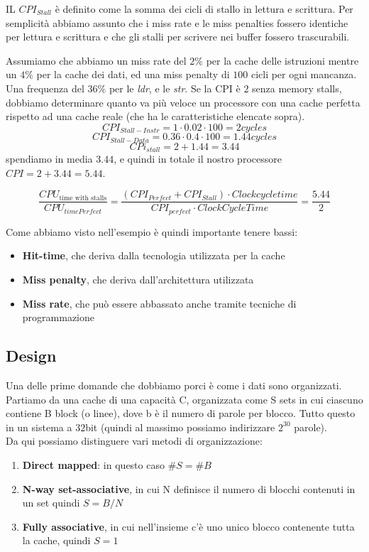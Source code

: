 \begin{observation}
	IL $CPI_{Stall}$ è definito come la somma dei cicli di stallo in lettura e scrittura. Per semplicità abbiamo assunto che i miss rate e le miss penalties fossero identiche per lettura e scrittura e che gli stalli per scrivere nei buffer fossero trascurabili.
\end{observation}

\begin{example}
	\label{example:cache_performance}
	Assumiamo che abbiamo un miss rate del \(2\%\) per la cache delle istruzioni mentre un \(4\%\) per la cache dei dati, ed una miss penalty di $100$ cicli per ogni mancanza. Una frequenza del \(36\%\) per le \emph{ldr}, e le \emph{str}. Se la CPI è $2$ senza memory stalls, dobbiamo determinare quanto va più veloce un processore con una cache perfetta rispetto ad una cache reale (che ha le caratteristiche elencate sopra).\\
	
	\[CPI_{Stall-Instr} = 1 \cdot 0.02 \cdot 100 = 2 cycles\]
	\[CPI_{Stall-Data} = 0.36 \cdot 0.4 \cdot 100 = 1.44 cycles\]
	\[CPi_{stall} = 2 + 1.44 = 3.44\]
	spendiamo in media $3.44$, e quindi in totale il nostro processore $CPI = 2 + 3.44 = 5.44$.
	
	\[\frac{CPU_{\text{time with stalls}}}{CPU_{time Perfect}} = \frac{(CPI_{Perfect} + CPI_{Stall}) \cdot Clockcycletime}{CPI_{perfect} \cdot ClockCycleTime} =  \frac{5.44}{2}\]
\end{example}

Come abbiamo visto nell'esempio è quindi importante tenere bassi:
\begin{itemize}
	\item \textbf{Hit-time}, che deriva dalla tecnologia utilizzata per la cache
	\item \textbf{Miss penalty}, che deriva dall'architettura utilizzata
	\item \textbf{Miss rate}, che può essere abbassato anche tramite tecniche di programmazione
\end{itemize}

\subsection{Design}
Una delle prime domande che dobbiamo porci è come i dati sono organizzati.\\
Partiamo da una cache di una capacità C, organizzata come S sets in cui ciascuno contiene B block (o linee), dove b è il numero di parole per blocco. Tutto questo in un sistema a $32$bit (quindi al massimo possiamo indirizzare $2^{30}$ parole).\\
Da qui possiamo distinguere vari metodi di organizzazione:
\begin{enumerate}
	\item \textbf{Direct mapped}: in questo caso $\#S=\#B$
	\item \textbf{N-way set-associative}, in cui N definisce il numero di blocchi contenuti in un set quindi $S=B/N$
	\item \textbf{Fully associative}, in cui nell'insieme c'è uno unico blocco contenente tutta la cache, quindi $S=1$
\end{enumerate}

